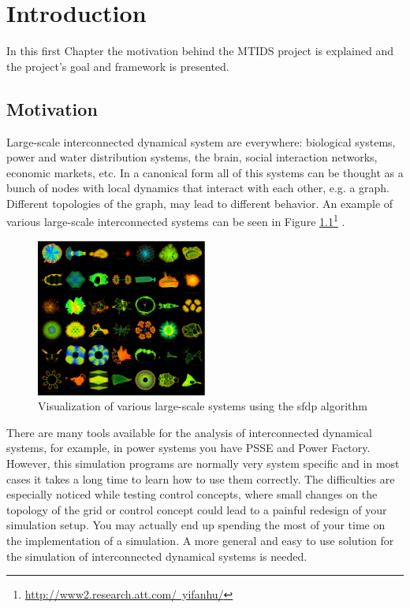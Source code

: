 \documentclass[a4paper,twoside, openright,12pt]{report}
\begin{document}
\pagestyle{fancy}

\tableofcontents 




\chapter{Introduction} \label{chapter1}

In this first Chapter the motivation behind the MTIDS project is explained and the project's goal and framework is presented.

\section{Motivation}
Large-scale interconnected dynamical system are everywhere: biological systems, power and water distribution systems, the brain, 
social interaction networks, economic markets, etc. In a canonical form all of this systems can be thought as a bunch of nodes with local dynamics 
that interact with each other, e.g. a graph. Different topologies of the graph, may lead to different behavior. An example of various 
large-scale interconnected systems can be seen in Figure \ref{largePic}\footnote{\href{http://www2.research.att.com/~yifanhu/}{http://www2.research.att.com/~yifanhu/}} \cite{LargeGraphs}. 


\begin{figure}[htb]
\centering
\includegraphics[width=0.5\textwidth]{pics/complex.eps}
\caption[Example of large-scale systems]{Visualization of various large-scale systems using the sfdp algorithm\cite{LargeGraphs}}
\label{largePic}
\end{figure}

There are many tools available for the analysis of interconnected dynamical systems, for example, in power systems you have PSSE and Power Factory. However,
this simulation programs are normally very system specific and in most cases it takes a long time to learn how to use them correctly. 
The difficulties are especially noticed while
testing control concepts, where small changes on the topology of the grid or control concept could lead to a painful redesign of your simulation setup. 
You may actually end up spending the most of your time on the implementation of a simulation. A more general and 
easy to use solution for the simulation of interconnected dynamical systems is needed.
\end{document}
